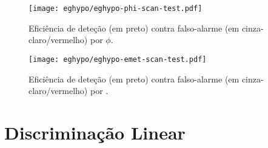 \begin{figure}
\begin{center}
\texttt{[image: eghypo/eghypo-phi-scan-test.pdf]}
\end{center}
\caption{Eficiência de deteção (em preto) contra
falso-alarme (em cinza-claro/vermelho) por $\phi$.}
\label{fig:eghypo-phi-scan-test}
\end{figure}

\begin{figure}
\begin{center}
\texttt{[image: eghypo/eghypo-emet-scan-test.pdf]}
\end{center}
\caption{Eficiência de deteção (em preto) contra falso-alarme (em
cinza-claro/vermelho) por \etem.}
\label{fig:eghypo-emet-scan-test}
\end{figure}






\section{Discriminação Linear}
\label{sec:lms}

